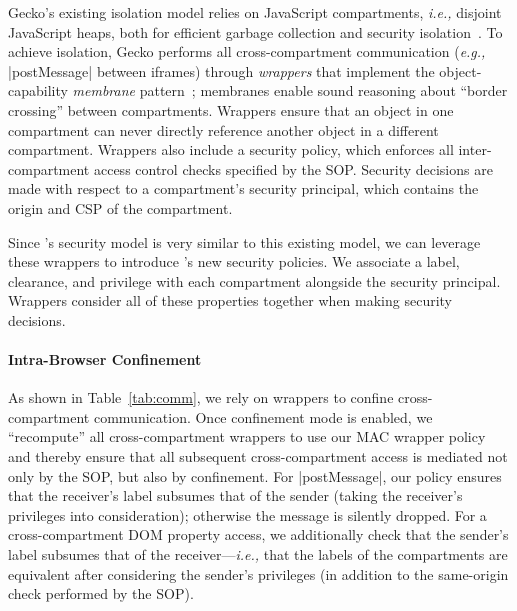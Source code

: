 Gecko's existing isolation model relies on JavaScript compartments, \emph{i.e.,}
disjoint JavaScript heaps, both for efficient garbage collection and
security isolation~\cite{wagner2011compartmental}.
%
To achieve isolation, Gecko performs all cross-compartment
communication (\emph{e.g.,} \js|postMessage| between iframes) through
\emph{wrappers} that implement the object-capability \emph{membrane}
pattern~\cite{miller2003paradigm,miller2006robust}; membranes enable
sound reasoning about ``border crossing'' between compartments. 
%
Wrappers ensure that an object in one compartment can
never directly reference another object in a different compartment.
Wrappers also include a security policy,
which enforces all inter-compartment access control checks
specified by the SOP\@.
%
Security decisions are made with respect to a compartment's
security principal, which contains the origin and CSP of the compartment.

Since \sys{}'s security model is very similar to this existing
model, we can leverage these wrappers to introduce \sys{}'s new
security policies.
%
We associate a label, clearance, and privilege with each compartment
alongside the security principal.
%
Wrappers consider all of these properties together when making
security decisions.

\paragraph{Intra-Browser Confinement}
%
As shown in Table~\ref{tab:comm}, we rely on wrappers to
confine cross-compartment communication.
%
Once confinement mode is enabled, we ``recompute'' all
cross-compartment wrappers to use our MAC wrapper policy and thereby
ensure that all subsequent cross-compartment access is mediated not
only by the SOP, but also by confinement.
%
%
For \js|postMessage|, our policy ensures that the receiver's label
subsumes that of the sender (taking the receiver's privileges into
consideration); otherwise the message is silently dropped.
%
For a cross-compartment DOM property access, we additionally check
that the sender's label subsumes that of the receiver---\emph{i.e.,}
that the labels of the compartments are equivalent after considering
the sender's privileges (in addition to the same-origin check
performed by the SOP).

